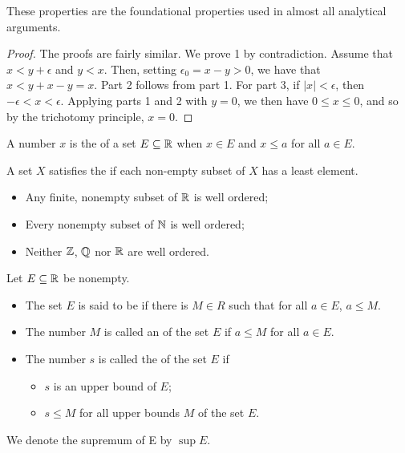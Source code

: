 These properties are the foundational properties used in almost all analytical arguments.

\begin{proof}
  The proofs are fairly similar. We prove 1 by contradiction. Assume that \(x < y + \epsilon\) and \(y < x\). Then, setting \(\epsilon_{0} = x - y > 0\), we have that \(x < y + x - y = x\). Part 2 follows from part 1. For part 3, if \(|x| < \epsilon\), then \(-\epsilon < x < \epsilon\). Applying parts 1 and 2 with \(y = 0\), we then have \(0 \leq x \leq 0\), and so by the trichotomy principle, \(x = 0\).
\end{proof}


\begin{definition}
  A number \(x\) is the  of a set \(E \subseteq \mathbb{R}\) when \(x \in E\) and \(x \leq a\) for all \(a \in E\).

  A set \(X\) satisfies the  if each non-empty subset of \(X\) has a least element.
\end{definition}

\begin{example}

  \begin{itemize}
  \item Any finite, nonempty subset of \(\mathbb{R}\) is well ordered;
  \item Every nonempty subset of \(\mathbb{N}\) is well ordered;
  \item Neither \(\mathbb{Z}\), \(\mathbb{Q}\) nor \(\mathbb{R}\) are well ordered.
  \end{itemize}
\end{example}

\begin{definition}
  Let \(E \subseteq \mathbb{R}\) be nonempty.
  \begin{itemize}
  \item The set \(E\) is said to be  if there is \(M \in R\) such that for all \(a \in E\), \(a \leq M\).
  \item The number \(M\) is called an  of the set \(E\) if \(a \leq M\) for all \(a \in E\).
  \item The number \(s\) is called the  of the set \(E\) if
    \begin{itemize}
    \item \(s\) is an upper bound of \(E\);
    \item \(s \leq M\) for all upper bounds \(M\) of the set \(E\).
    \end{itemize}
  \end{itemize}

  We denote the supremum of E by \(\sup E\).
\end{definition}

